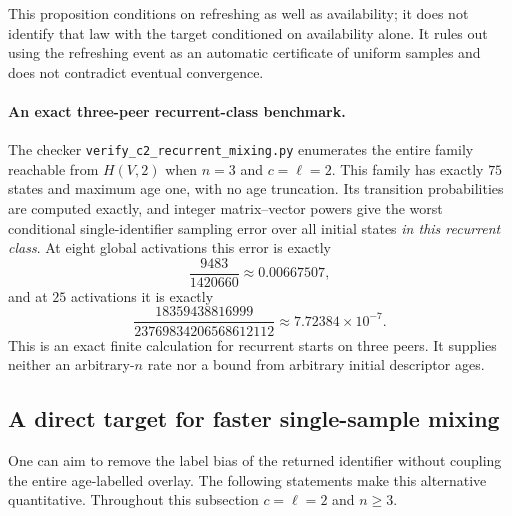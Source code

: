 \documentclass[11pt]{article}
\begin{document}
This proposition conditions on refreshing as well as availability;
it does not identify that law with the target conditioned on
availability alone. It rules out using the refreshing event as
an automatic certificate of uniform samples and does not contradict
eventual convergence.

\paragraph{An exact three-peer recurrent-class benchmark.}
The checker \texttt{verify\_c2\_recurrent\_mixing.py} enumerates
the entire family reachable from $H(V,2)$ when $n=3$ and
$c=\ell=2$. This family has exactly $75$ states and maximum
age one, with no age truncation. Its transition probabilities
are computed exactly, and integer matrix--vector powers give
the worst conditional single-identifier sampling error over
all initial states \emph{in this recurrent class}. At eight
global activations this error is exactly
\[
 \frac{9483}{1420660}\approx0.00667507,
\]
and at $25$ activations it is exactly
\[
 \frac{18359438816999}{23769834206568612112}
 \approx7.72384\times10^{-7}.
\]
This is an exact finite calculation for recurrent starts on
three peers. It supplies neither an arbitrary-$n$ rate nor a
bound from arbitrary initial descriptor ages.

\subsection{A direct target for faster single-sample mixing}

One can aim to remove the label bias of the returned identifier
without coupling the entire age-labelled overlay. The following
statements make this alternative quantitative. Throughout this
subsection $c=\ell=2$ and $n\ge3$.
\end{document}
